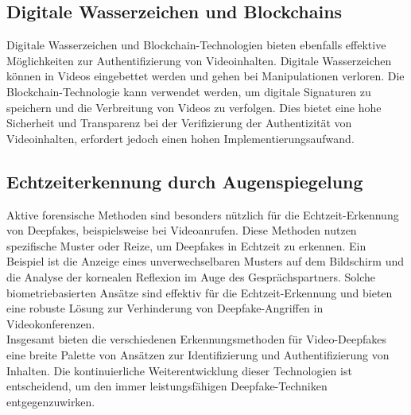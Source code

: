 \subsection*{Digitale Wasserzeichen und Blockchains}
Digitale Wasserzeichen und Blockchain-Technologien bieten ebenfalls effektive Möglichkeiten zur Authentifizierung von Videoinhalten.
Digitale Wasserzeichen können in Videos eingebettet werden und gehen bei Manipulationen verloren.
Die Blockchain-Technologie kann verwendet werden, um digitale Signaturen zu speichern und die Verbreitung von Videos zu verfolgen.
Dies bietet eine hohe Sicherheit und Transparenz bei der Verifizierung der Authentizität von Videoinhalten, erfordert jedoch einen hohen Implementierungsaufwand\cite{The-Emergence-of-Deepfake-Technology}.

\subsection*{Echtzeiterkennung durch Augenspiegelung}
Aktive forensische Methoden sind besonders nützlich für die Echtzeit-Erkennung von Deepfakes, beispielsweise bei Videoanrufen.
Diese Methoden nutzen spezifische Muster oder Reize, um Deepfakes in Echtzeit zu erkennen.
Ein Beispiel ist die Anzeige eines unverwechselbaren Musters auf dem Bildschirm und die Analyse der kornealen Reflexion im Auge des Gesprächspartners.
Solche biometriebasierten Ansätze sind effektiv für die Echtzeit-Erkennung und bieten eine robuste Lösung zur Verhinderung von Deepfake-Angriffen in Videokonferenzen\cite{detection-of-real-time-deepfakes}.\\

Insgesamt bieten die verschiedenen Erkennungsmethoden für Video-Deepfakes eine breite Palette von Ansätzen zur Identifizierung und Authentifizierung von Inhalten.
Die kontinuierliche Weiterentwicklung dieser Technologien ist entscheidend, um den immer leistungsfähigen Deepfake-Techniken entgegenzuwirken.
